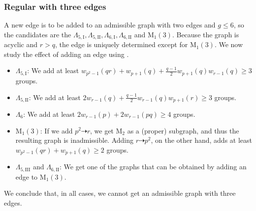 \documentclass{article}
\newcommand{\qlame}{\Lambda_{5,\text{I}}}
\newcommand{\qlamz}{\Lambda_{5,\text{II}}}
\newcommand{\qlamd}{\Lambda_{5,\text{III}}}
\newcommand{\slame}{\Lambda_{6, \text{I}}}
\newcommand{\slamz}{\Lambda_{6, \text{II}}}
\newcommand{\m}[1]{\text{M}_{#1}}
\newcommand{\hthref}[1]{\hyperref[#1]{\thref{#1}}}
\theoremstyle{plain}
\theoremstyle{definition}
\begin{document}
\begin{center}
{
}
\end{center}
\subsubsection*{Regular  with three edges}
A new edge is to be added to an admissible graph with two edges and $g \le 6$, so the candidates are the $\qlame, \qlamz, \slame, \slamz$ and $\m1(3)$. Because the graph is acyclic and $r > q$, the edge is uniquely determined except for $\m1(3)$. We now study the effect of adding an edge using \hthref{euppqr}.
\begin{itemize}
	\item $\qlame$: We add at least $w_{p^2 - 1}(qr) + w_{p + 1}(q) + \frac{q - 1}{2}w_{p + 1}(q)w_{r - 1}(q) \ge 3$ groups.
	\item $\qlamz$: We add at least $2w_{r - 1}(q) + \frac{q - 1}{2} w_{r - 1}(q)w_{p + 1}(r) \ge 3$ groups.
	\item $\Lambda_6$: We add at least $2w_{r - 1}(p) + 2w_{r - 1}(pq) \ge 4$ groups.
	\item $\m1(3)$: If we add $p^2 \dashrightarrow r$, we get $\m{2}$ as a (proper) subgraph, and thus the resulting graph is inadmissible. Adding $r \dashrightarrow p^2$, on the other hand, adds at least $w_{p^2 - 1}(qr) + w_{p + 1}(q) \ge 2$ groups. \nopagebreak[4]
	\item $\qlamd$ and $\slamz$: We get one of the graphs that can be obtained by adding an edge to $\m1(3)$.
\end{itemize} \nopagebreak[4]
We conclude that, in all cases, we cannot get an admissible graph with three edges.
\end{document}
